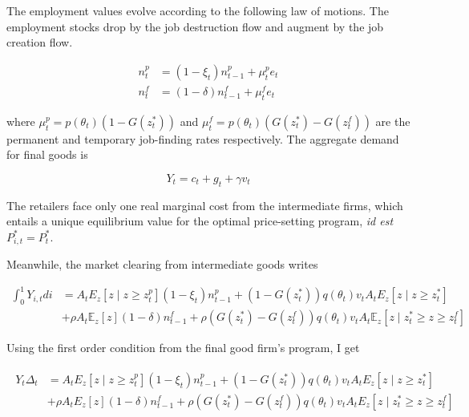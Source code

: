 The employment values evolve according to the following law of motions. The employment stocks drop by the job destruction flow and augment by the job creation flow.

\begin{align}
n_t^p &= \left( 1 - \xi_t \right) n_{t-1}^p + \mu_t^p e_t\\
n_t^f &= \left( 1 - \delta \right) n_{t-1}^f + \mu_t^f e_t
\end{align}

where $\mu_t^p = p\left( \theta_t \right) \left( 1- G\left( z_t^*\right)\right)$ and $\mu_t^f = p\left( \theta_t \right) \left( G\left( z_t^*\right)-G\left( z_t^f \right)\right)$ are the permanent and temporary job-finding rates respectively. The aggregate demand for final goods is

\begin{equation}
Y_t = c_t + g_t + \gamma v_t \label{eq:res_cons}
\end{equation}

The retailers face only one real marginal cost from the intermediate firms, which entails a unique equilibrium value for the optimal price-setting program, \emph{id est} $P_{i,t}^* = P_t^*$.

Meanwhile, the market clearing from intermediate goods writes

\begin{align*}
\int_{0}^{1} Y_{i,t} di &= A_t E_z \left[z \mid z \geq z_t^p \right] \left( 1 - \xi_t \right) n_{t-1}^p + \left( 1 - G\left( z_t^* \right)\right) q \left( \theta_t \right) v_t A_t E_z \left[z \mid z \geq z_t^* \right]\\
&+ \rho A_t \mathbb{E}_z \left[ z \right] \left( 1 - \delta \right) n_{t-1}^f + \rho \left( G\left( z_t^* \right) - G\left( z_t^f \right)\right) q \left( \theta_t \right) v_t A_t \mathbb{E}_z \left[z \mid z_t^* \geq z \geq z_t^f \right]
\end{align*}

Using the first order condition from the final good firm's program, I get

\begin{align}
\begin{split}
Y_t \Delta_t &= A_t E_z \left[z \mid z \geq z_t^p \right] \left( 1 - \xi_t \right) n_{t-1}^p + \left( 1 - G\left( z_t^* \right)\right) q \left( \theta_t \right) v_t A_t E_z \left[z \mid z \geq z_t^* \right]\\
&+ \rho A_t E_z \left[ z \right] \left( 1 - \delta \right) n_{t-1}^f + \rho \left( G\left( z_t^* \right) - G\left( z_t^f \right)\right) q \left( \theta_t \right) v_t A_t E_z \left[z \mid z_t^* \geq z \geq z_t^f \right] \label{eq:res_cons_int}
\end{split}
\end{align}

